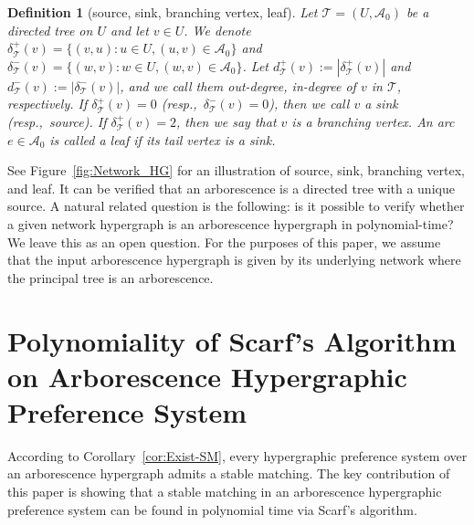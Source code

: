 \documentclass[11pt]{article}
\newtheorem{definition}[theorem]{Definition}
\begin{document}
\begin{definition}[source, sink, branching vertex, leaf]\label{def:Source-Sink-Branching}
    Let $\mathcal{T}=(U,\mathcal{A}_0)$ be a directed tree on $U$ and let $v\in U$. We denote $\delta^+_{\mathcal{T}}(v)=\{(v,u):u\in U,(u,v)\in\mathcal{A}_0\}$ and $\delta^-_{\mathcal{T}}(v)=\{(w,v):w\in U,(w,v)\in\mathcal{A}_0\}$. Let $d^+_{\mathcal{T}}(v):=|\delta^+_{\mathcal{T}}(v)|$ and $d^-_{\mathcal{T}}(v):=|\delta^-_{\mathcal{T}}(v)|$, and we call them out-degree, in-degree of $v$ in $\mathcal{T}$, respectively. If $\delta^+_{\mathcal{T}}(v)=0$ (resp.,~$\delta^-_{\mathcal{T}}(v)=0$), then we call $v$ a \emph{sink} (resp.,~\emph{source}). If $\delta^+_{\mathcal{T}}(v)=2$, then we say that $v$ is a \emph{branching vertex}. An arc $e\in\mathcal{A}_0$ is called a \emph{leaf} if its tail vertex is a sink.
\end{definition}

See Figure~\ref{fig:Network_HG} for an illustration of source, sink, branching vertex, and leaf. It can be verified that an arborescence is a directed tree with a unique source. A natural related question is the following: is it possible to verify whether a given network hypergraph is an arborescence hypergraph in polynomial-time? We leave this as an open question. For the purposes of this paper, we assume that the input arborescence hypergraph is given by its underlying network where the principal tree is an arborescence.






\section{Polynomiality of Scarf's Algorithm on Arborescence Hypergraphic Preference System}\label{sec:Poly-Scarf-Cases}

According to Corollary~\ref{cor:Exist-SM}, every hypergraphic preference system over an arborescence hypergraph admits a stable matching. The key contribution of this paper is showing that a stable matching in an arborescence hypergraphic preference system can be found in polynomial time via Scarf's algorithm.







\main*
\end{document}
